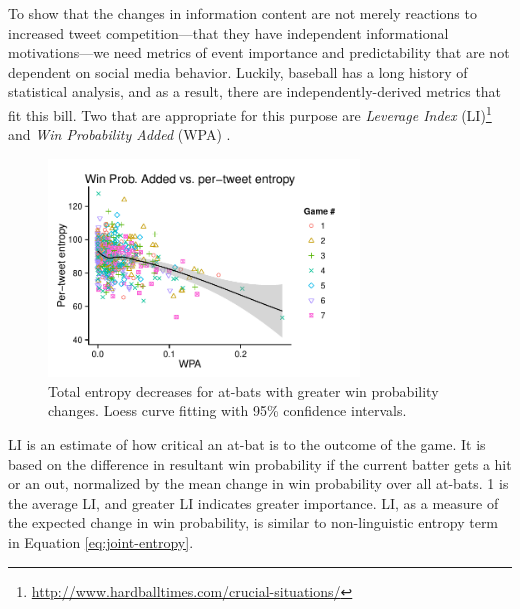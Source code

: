 \documentclass[11pt,letterpaper]{article}
\begin{document}
To show that the changes in information content are not merely reactions to increased tweet competition---that they have independent informational motivations---we need metrics of event importance and predictability that are not dependent on social media behavior.  Luckily, baseball has a long history of statistical analysis, and as a result, there are independently-derived metrics that fit this bill.  Two that are appropriate for this purpose are {\it Leverage Index} (LI)\footnote{\url{http://www.hardballtimes.com/crucial-situations/}} and  {\it Win Probability Added} (WPA) \cite{tango2007}.


\begin{figure}
 \centering
  \includegraphics[width=3.25in]{figures/fig3.pdf}\vspace*{-.7em}
 \caption{Total entropy decreases for at-bats with greater win probability changes. Loess curve fitting with 95\% confidence intervals.}\label{fig:wpa-tent-agg}\vspace*{-.5em}
\end{figure}


LI is an estimate of how critical an at-bat is to the outcome of the game.  It is based on the difference in resultant win probability if the current batter gets a hit or an out, normalized by the mean change in win probability over all at-bats. 1 is the average LI, and greater LI indicates greater importance.  LI, as a measure of the expected change in win probability, is similar to non-linguistic entropy term in Equation \ref{eq:joint-entropy}. 
\end{document}
